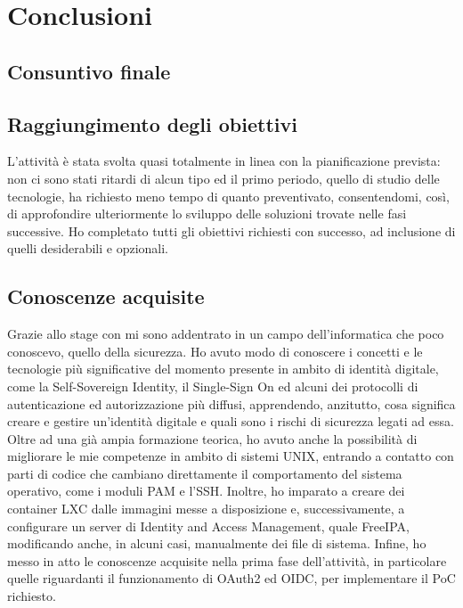 
\chapter{Conclusioni}
\label{cap:conclusioni}

\section{Consuntivo finale}

\section{Raggiungimento degli obiettivi}

L'attività è stata svolta quasi totalmente in linea con la pianificazione prevista: non ci sono stati ritardi di alcun tipo ed il primo periodo, quello di studio delle tecnologie, ha richiesto meno tempo di quanto preventivato, consentendomi, così, di approfondire ulteriormente lo sviluppo delle soluzioni trovate nelle fasi successive.
Ho completato tutti gli obiettivi richiesti con successo, ad inclusione di quelli desiderabili e opzionali.

\section{Conoscenze acquisite}

Grazie allo stage con \myAzienda mi sono addentrato in un campo dell'informatica che poco conoscevo, quello della sicurezza. Ho avuto modo di conoscere i concetti e le tecnologie più significative del momento presente in ambito di identità digitale, come la Self-Sovereign Identity, il Single-Sign On ed alcuni dei protocolli di autenticazione ed autorizzazione più diffusi, apprendendo, anzitutto, cosa significa creare e gestire un'identità digitale e quali sono i rischi di sicurezza legati ad essa. Oltre ad una già ampia formazione teorica, ho avuto anche la possibilità di migliorare le mie competenze in ambito di sistemi UNIX, entrando a contatto con parti di codice che cambiano direttamente il comportamento del sistema operativo, come i moduli PAM e l'SSH.
Inoltre, ho imparato a creare dei container LXC dalle immagini messe a disposizione e, successivamente, a configurare un server di Identity and Access Management, quale FreeIPA, modificando anche, in alcuni casi, manualmente dei file di sistema.
Infine, ho messo in atto le conoscenze acquisite nella prima fase dell'attività, in particolare quelle riguardanti il funzionamento di OAuth2 ed OIDC, per implementare il PoC richiesto. 

